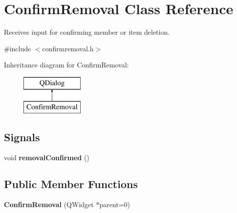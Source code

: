 \hypertarget{class_confirm_removal}{}\section{Confirm\+Removal Class Reference}
\label{class_confirm_removal}


Receives input for confirming member or item deletion.  




{\ttfamily \#include $<$confirmremoval.\+h$>$}

Inheritance diagram for Confirm\+Removal\+:\begin{figure}[H]
\begin{center}
\leavevmode
\includegraphics[height=2.000000cm]{class_confirm_removal}
\end{center}
\end{figure}
\subsection*{Signals}
\begin{DoxyCompactItemize}
\item 
\mbox{\label{class_confirm_removal_a76aeed50b8cde86b01e23141e265385d}} 
void {\bfseries removal\+Confirmed} ()
\end{DoxyCompactItemize}
\subsection*{Public Member Functions}
\begin{DoxyCompactItemize}
\item 
\mbox{\label{class_confirm_removal_a93632c6ffbc8e0a45d4516f4e1387138}} 
{\bfseries Confirm\+Removal} (Q\+Widget $\ast$parent=0)
\end{DoxyCompactItemize}
